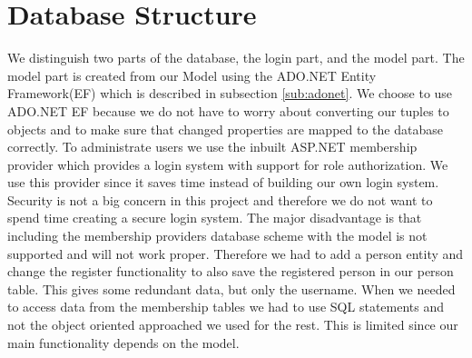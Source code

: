 \section{Database Structure}
\label{sec:databasestructure}

We distinguish two parts of the database, the login part, and the model part. 
The model part is created from our Model  using the ADO.NET Entity Framework(EF) which is described in subsection \ref{sub:adonet}. 
We choose to use ADO.NET EF because we do not have to worry about converting our tuples to objects and to make sure that changed properties are mapped to the database correctly.  
To administrate users we use the inbuilt ASP.NET membership provider which provides a login system with support for role authorization. 
We use this provider since it saves time instead of building our own login system. 
Security is not a big concern in this project and therefore we do not want to spend time creating a secure login system. 
The major disadvantage is that including the membership providers database scheme with the model is not supported and will not work proper. 
Therefore we had to add a person entity and change the register functionality to also save the registered person in our person table. 
This gives some redundant data, but only the username. 
When we needed to access data from the membership tables we had to use SQL statements and not the object oriented approached we used for the rest. This is limited since our main functionality depends on the model. 




